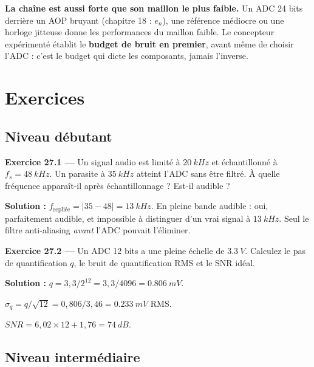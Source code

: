 \documentclass[12pt,a4paper,twoside]{book}
\begin{document}
\begin{intuition}
\textbf{La chaîne est aussi forte que son maillon le plus faible.} Un ADC 24 bits derrière un AOP bruyant (chapitre 18 : $e_n$), une référence médiocre ou une horloge jitteuse donne les performances du maillon faible. Le concepteur expérimenté établit le \textbf{budget de bruit en premier}, avant même de choisir l'ADC : c'est le budget qui dicte les composants, jamais l'inverse.
\end{intuition}

\section*{Exercices}

\subsection*{Niveau débutant}

\textbf{Exercice 27.1 ---} Un signal audio est limité à $\SI{20}{kHz}$ et échantillonné à $f_s = \SI{48}{kHz}$. Un parasite à $\SI{35}{kHz}$ atteint l'ADC sans être filtré. À quelle fréquence apparaît-il après échantillonnage ? Est-il audible ?

\begin{pratique}
\textbf{Solution :} $f_{\text{repliée}} = |35 - 48| = \SI{13}{kHz}$. En pleine bande audible : oui, parfaitement audible, et impossible à distinguer d'un vrai signal à $\SI{13}{kHz}$. Seul le filtre anti-aliasing \textit{avant} l'ADC pouvait l'éliminer.
\end{pratique}

\textbf{Exercice 27.2 ---} Un ADC 12 bits a une pleine échelle de $\SI{3.3}{V}$. Calculez le pas de quantification $q$, le bruit de quantification RMS et le SNR idéal.

\begin{pratique}
\textbf{Solution :} $q = 3{,}3/2^{12} = 3{,}3/4096 = \SI{0.806}{mV}$.

$\sigma_q = q/\sqrt{12} = 0{,}806/3{,}46 = \SI{0.233}{mV}$ RMS.

$SNR = 6{,}02\times12 + 1{,}76 = \SI{74}{dB}$.
\end{pratique}

\subsection*{Niveau intermédiaire}
\end{document}
